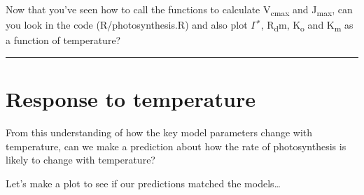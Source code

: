 \documentclass[]{article}
\begin{document}
Now that you've seen how to call the functions to calculate
V\textsubscript{cmax} and J\textsubscript{max}, can you look in the code
(R/photosynthesis.R) and also plot \(\Gamma\)\(^{*}\),
R\textsubscript{d}m, K\textsubscript{o} and K\textsubscript{m} as a
function of temperature?

\begin{center}\rule{0.5\linewidth}{\linethickness}\end{center}

\hypertarget{response-to-temperature}{%
\section{Response to temperature}\label{response-to-temperature}}

From this understanding of how the key model parameters change with
temperature, can we make a prediction about how the rate of
photosynthesis is likely to change with temperature?

Let's make a plot to see if our predictions matched the models\ldots{}
\end{document}
